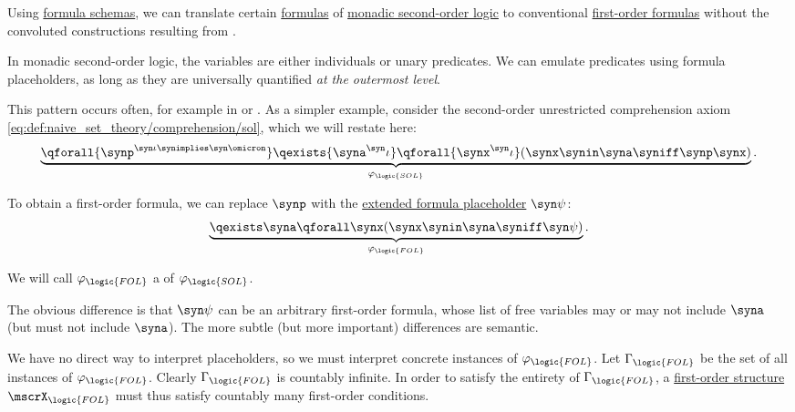 \begin{definition}\label{def:fol_adaptation_of_monadic_sol_theory}\mimprovised
  Using \hyperref[def:fol_formula_schema]{formula schemas}, we can translate certain \hyperref[def:hol_expression/formula]{formulas} of \hyperref[def:second_order_logic]{monadic second-order logic} to conventional \hyperref[def:fol_formula]{first-order formulas} without the convoluted constructions resulting from .

  In monadic second-order logic, the variables are either individuals or unary predicates. We can emulate predicates using formula placeholders, as long as they are universally quantified \emph{at the outermost level}.

  This pattern occurs often, for example in  or . As a simpler example, consider the second-order unrestricted comprehension axiom \eqref{eq:def:naive_set_theory/comprehension/sol}, which we will restate here:
  \begin{equation*}
    \underbrace{\qforall {\synp^{\syn\iota \synimplies \syn\omicron}} \qexists {\syna^\syn\iota} \qforall {\synx^\syn\iota} (\synx \synin \syna \syniff \synp \synx)}_{\varphi_{\logic{SOL}}}.
  \end{equation*}

   To obtain a first-order formula, we can replace \( \synp \) with the \hyperref[def:fol_formula_schema]{extended formula placeholder} \( \syn\psi \):
  \begin{equation*}
    \underbrace{\qexists \syna \qforall \synx (\synx \synin \syna \syniff \syn\psi)}_{\varphi_{\logic{FOL}}}.
  \end{equation*}

  We will call \( \varphi_{\logic{FOL}} \) a  of \( \varphi_{\logic{SOL}} \).

  The obvious difference is that \( \syn\psi \) can be an arbitrary first-order formula, whose list of free variables may or may not include \( \syna \) (but must not include \( \syna \)). The more subtle (but more important) differences are semantic.

  We have no direct way to interpret placeholders, so we must interpret concrete instances of \( \varphi_{\logic{FOL}} \). Let \( \Gamma_{\logic{FOL}} \) be the set of all instances of \( \varphi_{\logic{FOL}} \). Clearly \( \Gamma_{\logic{FOL}} \) is countably infinite. In order to satisfy the entirety of \( \Gamma_{\logic{FOL}} \), a \hyperref[def:fol_structure]{first-order structure} \( \mscrX_{\logic{FOL}} \) must thus satisfy countably many first-order conditions.


\end{definition}
